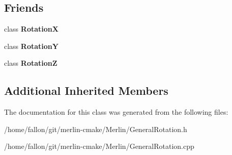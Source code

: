 \subsection*{Friends}
\begin{DoxyCompactItemize}
\item 
\mbox{\label{classGeneralRotation_aa9126bf86448aec856025132f7ab50b4}} 
class {\bfseries RotationX}
\item 
\mbox{\label{classGeneralRotation_aa8f212eef88f1f69f88268b7a083b034}} 
class {\bfseries RotationY}
\item 
\mbox{\label{classGeneralRotation_adc2f3d65267e35d6e20f522271f30831}} 
class {\bfseries RotationZ}
\end{DoxyCompactItemize}
\subsection*{Additional Inherited Members}


The documentation for this class was generated from the following files\+:\begin{DoxyCompactItemize}
\item 
/home/fallon/git/merlin-\/cmake/\+Merlin/General\+Rotation.\+h\item 
/home/fallon/git/merlin-\/cmake/\+Merlin/General\+Rotation.\+cpp\end{DoxyCompactItemize}
